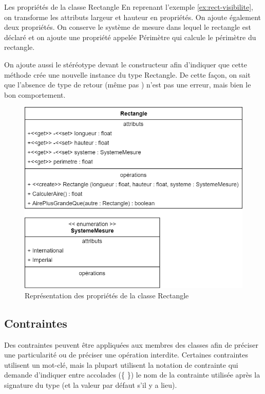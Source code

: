 \begin{exemple}{Les propriétés de la classe Rectangle}
	En reprenant l'exemple \ref{ex:rect-visibilite}, on transforme les attributs largeur et hauteur en propriétés. On ajoute également deux propriétés. On conserve le système de mesure dans lequel le rectangle est déclaré et on ajoute une propriété appelée Périmètre qui calcule le périmètre du rectangle.
	
	On ajoute aussi le stéréotype  devant le constructeur afin d'indiquer que cette méthode crée une nouvelle instance du type Rectangle. De cette façon, on sait que l'absence de type de retour (même pas ) n'est pas une erreur, mais bien le bon comportement.
	
	\begin{figure}[H]
		\caption{Représentation des propriétés de la classe Rectangle}
		\centering
		\includegraphics[scale=0.4]{dcc-rect-proprietes.png}
	\end{figure}
	
\end{exemple}

\subsection{Contraintes}
\label{ssec:dcc-contraintes}

Des contraintes peuvent être appliquées aux membres des classes afin de préciser une particularité ou de préciser une opération interdite. Certaines contraintes utilisent un mot-clé, mais la plupart utilisent la notation de contrainte qui demande d'indiquer entre accolades (\{ \}) le nom de la contrainte utilisée après la signature du type (et la valeur par défaut s'il y a lieu).

